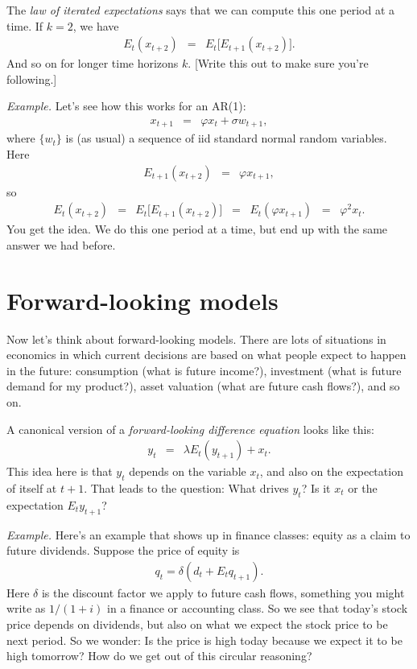 \documentclass[11pt]{article}
\begin{document}
The {\it law of iterated expectations\/} says that we can compute this one period at
a time.
If $k=2$, we have
\begin{eqnarray*}
    E_t (x_{t+2}) &=&  E_t \big[ E_{t+1} (x_{t+2} ) \big].
\end{eqnarray*}
And so on for longer time horizons $k$.
[Write this out to make sure you're following.]

{\it Example.\/}
Let's see how this works for an AR(1):
\begin{eqnarray*}
    x_{t+1} &=& \varphi x_t + \sigma w_{t+1} ,
\end{eqnarray*}
where $\{ w_t \}$ is (as usual) a sequence of iid standard normal random variables.
Here
\begin{eqnarray*}
    E_{t+1} (x_{t+2}) &=&  \varphi x_{t+1} ,
\end{eqnarray*}
so
\begin{eqnarray*}
    E_{t} (x_{t+2}) &=&  E_t \big[ E_{t+1} (x_{t+2})\big]
        \;\;=\;\; E_t (\varphi x_{t+1})
        \;\;=\;\; \varphi^2 x_{t} .
\end{eqnarray*}
You get the idea.  We do this one period at a time, but end up with the same
answer we had before.



\section{Forward-looking models}

Now let's think about forward-looking models.
There are lots of situations in economics in which current decisions are based on
what people expect to happen in the future:
consumption (what is future income?), investment (what is future demand for my product?),
asset valuation (what are future cash flows?), and so on.

A canonical version of a {\it forward-looking difference equation\/} looks like this:
\begin{eqnarray}
    y_t &=& \lambda E_t (y_{t+1}) + x_t .
    \label{eq:canonical}
\end{eqnarray}
This idea here is that $y_t$ depends on the variable $x_t$,
and also on the expectation of itself at $t+1$.
That leads to the question: What drives $y_t$?
Is it $x_t$ or the expectation $E_t y_{t+1}$?

{\it Example.\/}
Here's an example that shows up in finance classes: equity as a claim to future dividends.
Suppose the price of equity is
\begin{eqnarray*}
    q_t = \delta (d_t + E_t q_{t+1} ) .
\end{eqnarray*}
Here $\delta$ is the discount factor we apply to future cash flows,
something you might write as $1/(1+i)$ in a finance or accounting class.
So we see that today's stock price depends on dividends, but also
on what we expect the stock price to be next period.
So we wonder:  Is the price is high today because we expect it to be high tomorrow?
How do we get out of this circular reasoning?
\end{document}
